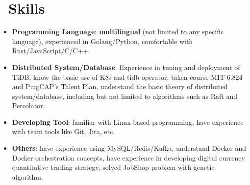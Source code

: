 \documentclass{resume}
\newcommand{\en}[1]{#1}
\newcommand{\zh}[1]{}
\begin{document}
\section{\faCogs\ \en{Skills}\zh{技能}}
\begin{itemize}[parsep=0.25ex]
      \item \en{\textbf{Programming Language}:
                  \textbf{multilingual} (not limited to any specific language), 
                  experienced in Golang/Python, 
                  comfortable with Rust/JavaScript/C/C++}
            \zh{\textbf{编程语言}:
                  \textbf{泛语言}（编程不受特定语言限制），
                  熟悉 Golang/Python，
                  了解 Rust/JavaScript/C/C++ 等}

      \item \en{\textbf{Distributed System/Database}:
                  Experience in tuning and deployment of TiDB, know the basic use of K8s and tidb-operator.
                  taken course MIT 6.824 and PingCAP's Talent Plan,
                  understand the basic theory of distributed system/database,
                  including but not limited to algorithms such as Raft and Percolator.}
            \zh{\textbf{分布式系统/数据库}:
                  有分布式数据库 TiDB 的调优开发以及部署经验，了解 K8s 以及 tidb-operator 的基本使用。
                  自主学习了 MIT 6.824 和 PingCAP's Talent Plan 等课程，
                  了解分布式系统/数据库的基本理论，包括但不限于 Raft 和 Percolator 等算法}

      \item \en{\textbf{Developing Tool}:
                  familiar with Linux-based programming,
                  have experience with team tools like Git, Jira, etc.}
            \zh{\textbf{开发工具}:
                  熟悉 Linux，有 Git、Jira 等团队协作工具的使用经验}

      \item \en{\textbf{Others}:
                  have experience using MySQL/Redis/Kafka, 
                  understand Docker and Docker orchestration concepts, 
                  have experience in developing digital currency quantitative trading strategy, 
                  solved JobShop problem with genetic algorithm.}
            \zh{\textbf{其它}:
                  有 MySQL/Redis/Kafka 使用经验，了解容器及容器编排相关概念，
                  开发过数字货币量化交易策略，使用遗传算法解决过 JobShop 问题}
\end{itemize}
\end{document}
